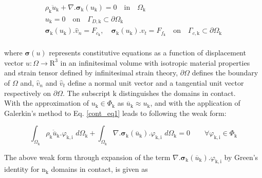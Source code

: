 \begin{equation}\label{cont_eq}
\begin{split}
\rho_\mathrm{k}\ddot{u}_\mathrm{k} +\nabla.\bm{\sigma}_\mathrm{k}(u_\mathrm{k}) =0 \quad \mathrm{in} \quad \Omega_\mathrm{k}\\ 
u_\mathrm{k} = 0\quad \mathrm{on}\quad\Gamma_{D,\mathrm{k}}\subset\partial\Omega_\mathrm{k}\\
\bm{\sigma}_\mathrm{k}(u_\mathrm{k}).\hat{v}_n=F_{c_\mathrm{k}},\quad\bm{\sigma}_\mathrm{k}(u_\mathrm{k}).\hat{v}_t=F_{f_\mathrm{k}}\quad\mathrm{on}\quad\Gamma_{c,\mathrm{k}}\subset\partial\Omega_\mathrm{k}\\
\end{split}
\end{equation}

where $\bm{\sigma}(u)$ represents constitutive equations as a function of displacement vector $u:\Omega \rightarrow \mathrm{R}^3$ in an infinitesimal volume with isotropic material properties and strain tensor defined by infinitesimal strain theory, $\partial\Omega$ defines the boundary of $\Omega$ and,  $\hat{v}_n$ and $\hat{v}_t$ define a normal unit vector and a tangential unit vector respectively on $\partial\Omega$. The subscript $\mathrm{k}$ distinguishes the domains in contact.\\

With the approximation of $u_{\mathrm{k}} \in \Phi_\mathrm{k}$ as $\overline{u}_{\mathrm{k}}\approx u_{\mathrm{k}}$, and with the application of Galerkin's method to Eq. \eqref{cont_eq1} leads to following the weak form:

\begin{equation}
   \int_{\Omega_\mathrm{k}}\rho_\mathrm{k} \ddot{\overline{u}}_{\mathrm{k}}. \varphi_{\mathrm{k},\mathrm{i}} \,\, d\Omega_\mathrm{k}+\int_{\Omega_\mathrm{k}}\nabla.\bm{\sigma}_\mathrm{k}(\overline{u}_{\mathrm{k}}).\varphi_{\mathrm{k},\mathrm{i}} \,\, d\Omega_\mathrm{k}=0 \qquad \forall \varphi_{\mathrm{k},\mathrm{i}} \in \Phi_\mathrm{k} \label{cont2}
\end{equation}

The above weak form through expansion of the term $\nabla.\bm{\sigma}_\mathrm{k}(\overline{u}_{\mathrm{k}}).\varphi_{\mathrm{k},\mathrm{i}}$ by Green's identity  for $\mathrm{n}_{\mathrm{\mathrm{k}}}$ domains in contact, is given as

